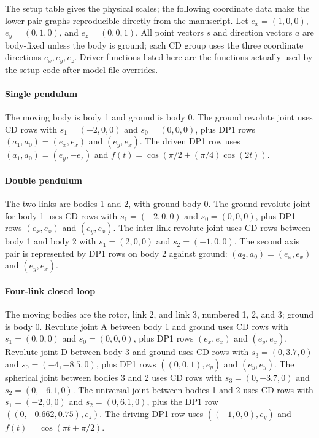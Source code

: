 \documentclass[preprint,12pt]{elsarticle}
\begin{document}
The setup table gives the physical scales; the following coordinate data make
the lower-pair graphs reproducible directly from the manuscript. Let
$e_x=(1,0,0)$, $e_y=(0,1,0)$, and $e_z=(0,0,1)$. All point vectors $s$ and
direction vectors $a$ are body-fixed unless the body is ground; each CD group
uses the three coordinate directions $e_x,e_y,e_z$. Driver functions listed
here are the functions actually used by the setup code after model-file
overrides.

\paragraph{Single pendulum}
The moving body is body 1 and ground is body 0. The ground revolute joint uses
CD rows with $s_1=(-2,0,0)$ and $s_0=(0,0,0)$, plus DP1 rows
$(a_1,a_0)=(e_x,e_x)$ and $(e_y,e_x)$. The driven DP1 row uses
$(a_1,a_0)=(e_y,-e_z)$ and
$f(t)=\cos(\pi/2+(\pi/4)\cos(2t))$.

\paragraph{Double pendulum}
The two links are bodies 1 and 2, with ground body 0. The ground revolute
joint for body 1 uses CD rows with $s_1=(-2,0,0)$ and $s_0=(0,0,0)$, plus DP1
rows $(e_x,e_x)$ and $(e_y,e_x)$. The inter-link revolute joint uses CD rows
between body 1 and body 2 with $s_1=(2,0,0)$ and $s_2=(-1,0,0)$. The second
axis pair is represented by DP1 rows on body 2 against ground:
$(a_2,a_0)=(e_x,e_x)$ and $(e_y,e_x)$.

\paragraph{Four-link closed loop}
The moving bodies are the rotor, link 2, and link 3, numbered 1, 2, and 3;
ground is body 0. Revolute joint A between body 1 and ground uses CD rows with
$s_1=(0,0,0)$ and $s_0=(0,0,0)$, plus DP1 rows $(e_x,e_x)$ and $(e_y,e_x)$.
Revolute joint D between body 3 and ground uses CD rows with
$s_3=(0,3.7,0)$ and $s_0=(-4,-8.5,0)$, plus DP1 rows
$((0,0,1),e_y)$ and $(e_y,e_y)$. The spherical joint between bodies 3 and 2
uses CD rows with $s_3=(0,-3.7,0)$ and $s_2=(0,-6.1,0)$. The universal joint
between bodies 1 and 2 uses CD rows with $s_1=(-2,0,0)$ and
$s_2=(0,6.1,0)$, plus the DP1 row
$((0,-0.662,0.75),e_z)$. The driving DP1 row uses
$((-1,0,0),e_y)$ and $f(t)=\cos(\pi t+\pi/2)$.
\end{document}
